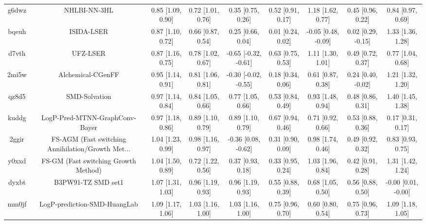\documentclass{article}
\begin{document}
\begin{center}
\begin{longtable}{|ccccccccc|}
 g6dwz &                                       NHLBI-NN-3HL &  0.85 [1.09, 0.90] &  0.72 [1.01, 0.76] &     0.35 [0.75, 0.26] &  0.52 [0.91, 0.17] &     1.18 [1.62, 0.77] &     0.45 [0.96, 0.22] &     0.84 [0.97, 0.69] \\
 bqeuh &                                         ISIDA-LSER &  0.87 [1.10, 0.72] &  0.66 [0.87, 0.54] &     0.25 [0.66, 0.04] &  0.01 [0.24, 0.02] &   -0.05 [0.48, -0.09] &    0.02 [0.29, -0.15] &     1.33 [1.36, 1.28] \\
 d7vth &                                           UFZ-LSER &  0.87 [1.16, 0.75] &  0.78 [1.02, 0.67] &  -0.65 [-0.32, -0.61] &  0.63 [0.75, 0.53] &     1.11 [1.30, 1.01] &     0.49 [0.72, 0.37] &     0.77 [1.04, 0.68] \\
 2mi5w &                                  Alchemical-CGenFF &  0.95 [1.14, 0.91] &  0.81 [1.06, 0.81] &  -0.30 [-0.02, -0.55] &  0.18 [0.34, 0.06] &     0.61 [0.87, 0.38] &    0.24 [0.40, -0.02] &     1.21 [1.32, 1.20] \\
 qz8d5 &                                      SMD-Solvation &  0.97 [1.14, 0.84] &  0.84 [1.05, 0.66] &     0.77 [1.05, 0.66] &  0.53 [0.84, 0.49] &     0.93 [1.48, 0.94] &     0.48 [0.86, 0.31] &     1.40 [1.45, 1.38] \\
 kuddg &                     LogP-Pred-MTNN-GraphConv-Bayer &  0.97 [1.18, 0.86] &  0.89 [1.10, 0.79] &     0.89 [1.10, 0.79] &  0.67 [0.94, 0.46] &     0.71 [0.92, 0.66] &     0.53 [0.88, 0.36] &     0.17 [0.31, 0.17] \\
 2ggir &  FS-AGM (Fast switching Annihilation/Growth Met... &  1.04 [1.23, 0.99] &  0.98 [1.16, 0.97] &   -0.36 [0.08, -0.62] &  0.31 [0.90, 0.09] &     0.98 [1.74, 0.46] &     0.49 [0.92, 0.32] &     0.83 [0.93, 0.75] \\
 y0xxd &               FS-GM (Fast switching Growth Method) &  1.04 [1.50, 0.89] &  0.72 [1.22, 0.56] &     0.37 [0.93, 0.18] &  0.33 [0.95, 0.24] &     1.03 [1.96, 0.84] &     0.42 [0.91, 0.28] &     1.31 [1.42, 1.24] \\
 dyxbt &                                 B3PW91-TZ SMD set1 &  1.07 [1.31, 1.03] &  0.96 [1.19, 0.93] &     0.96 [1.19, 0.93] &  0.55 [0.88, 0.39] &     0.68 [1.05, 0.50] &     0.56 [0.88, 0.50] &   -0.00 [0.01, -0.00] \\
 mm0jf &                       LogP-prediction-SMD-HuangLab &  1.09 [1.17, 1.06] &  1.03 [1.16, 1.00] &     1.03 [1.16, 1.00] &  0.75 [0.96, 0.70] &     0.60 [0.80, 0.54] &     0.75 [0.96, 0.73] &     1.09 [1.18, 1.05] \\

\end{longtable}
\end{center}
\end{document}
